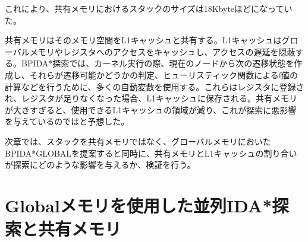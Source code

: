 \documentclass[a4paper,11pt,oneside,openany]{jsbook}
\begin{document}
これにより、共有メモリにおけるスタックのサイズは18Kbyteほどになっていた。

共有メモリはそのメモリ空間をL1キャッシュと共有する。L1キャッシュはグローバルメモリやレジスタへのアクセスをキャッシュし、アクセスの遅延を隠蔽する。BPIDA*探索では、カーネル実行の際、現在のノードから次の遷移状態を作成し、それらが遷移可能かどうかの判定、ヒューリスティック関数によるf値の計算などを行うために、多くの自動変数を使用する。これらはレジスタに登録され、レジスタが足りなくなった場合、L1キャッシュに保存される。共有メモリが大きすぎると、使用できるL1キャッシュの領域が減り、これが探索に悪影響を与えているのではと予想した。

次章では、スタックを共有メモリではなく、グローバルメモリにおいたBPIDA*GLOBALを提案すると同時に、共有メモリとL1キャッシュの割り合いが探索にどのような影響を与えるか、検証を行う。






\chapter{Globalメモリを使用した並列IDA*探索と共有メモリ}
\end{document}
